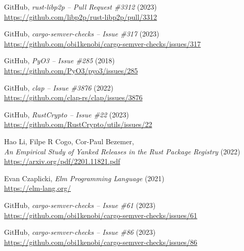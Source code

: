 \documentclass[licencjacka,en]{pracamgr}
\begin{document}
\begin{thebibliography}{99}

 GitHub,
	\textit{rust-libp2p -- Pull Request \#3312} (2023) \\
	\url{https://github.com/libp2p/rust-libp2p/pull/3312}



 GitHub,
	\textit{cargo-semver-checks -- Issue \#317} (2023) \\
	\url{https://github.com/obi1kenobi/cargo-semver-checks/issues/317}



 GitHub,
    \textit{PyO3 -- Issue \#285} (2018) \\
    \url{https://github.com/PyO3/pyo3/issues/285}

 GitHub,
    \textit{clap -- Issue \#3876} (2022) \\
    \url{https://github.com/clap-rs/clap/issues/3876}

 GitHub,
    \textit{RustCrypto -- Issue \#22} (2023) \\
    \url{https://github.com/RustCrypto/utils/issues/22}

 Hao Li, Filpe R Cogo, Cor-Paul Bezemer, \\
    \textit{An Empirical Study of Yanked Releases in the Rust Package Registry} (2022) \\
	\url{https://arxiv.org/pdf/2201.11821.pdf}



 Evan Czaplicki,
    \textit{Elm Programming Language} (2021) \\
    \url{https://elm-lang.org/}



 GitHub,
	\textit{cargo-semver-checks -- Issue \#61} (2023) \\
	\url{https://github.com/obi1kenobi/cargo-semver-checks/issues/61}

 GitHub,
	\textit{cargo-semver-checks -- Issue \#86} (2023) \\
	\url{https://github.com/obi1kenobi/cargo-semver-checks/issues/86}





\end{thebibliography}
\end{document}
